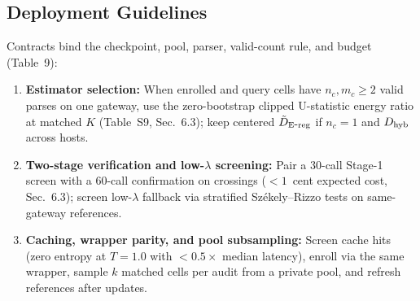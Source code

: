 \subsection{Deployment Guidelines}
Contracts bind the checkpoint, pool, parser, valid-count rule, and budget (Table~9):
\begin{enumerate}
    \item \textbf{Estimator selection:} When enrolled and query cells have $n_c, m_c \ge 2$ valid parses on one gateway, use the zero-bootstrap clipped U-statistic energy ratio at matched $K$ (Table~S9, Sec.~6.3); keep centered $\tilde D_{\mathrm{E\mbox{-}reg}}{}$ if $n_c = 1$ and $D_{\mathrm{hyb}}{}$ across hosts.
    \item \textbf{Two-stage verification and low-$\lambda$ screening:} Pair a 30-call Stage-1 screen with a 60-call confirmation on crossings ($<1$~cent expected cost, Sec.~6.3); screen low-$\lambda$ fallback via stratified Sz\'ekely--Rizzo tests on same-gateway references.
    \item \textbf{Caching, wrapper parity, and pool subsampling:} Screen cache hits (zero entropy at $T=1.0$ with $<0.5\times$ median latency), enroll via the same wrapper, sample $k$ matched cells per audit from a private pool, and refresh references after updates.
\end{enumerate}

